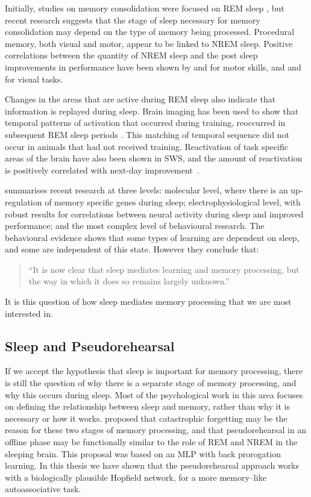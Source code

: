 Initially, studies on memory consolidation were focused on REM sleep \citep{Greenberg1981}, but recent research suggests that the stage of sleep necessary for memory consolidation may depend on the type of memory being processed.  Procedural memory, both visual and motor, appear to be linked to NREM sleep.  Positive correlations between the quantity of NREM sleep and the post sleep improvements in performance have been shown by \citet{Smith1994} and \citet{Walker2002a} for motor skills, and  \citet{Maquet2003} and \citet{Huber2004} for visual tasks.

Changes in the areas that are active during REM sleep also indicate that information is replayed during sleep.   Brain imaging has been used to show that temporal patterns of activation that occurred during training, reoccurred in subsequent REM sleep periods \citep{Pennartz2002,Maquet2000}.  This matching of temporal sequence did not occur in animals that had not received training.  Reactivation of task specific areas of the brain have also been shown in SWS, and the amount of reactivation is positively correlated with next-day improvement~\citep{Peigneux2004}.   

\citet{Walker2006} summarises recent research at three levels: molecular level, where there is an up-regulation of memory specific genes during sleep; electrophysiological level, with robust results for correlations between neural activity during sleep and improved performance; and the most complex level of behavioural research.  The behavioural evidence shows that some types of learning are dependent on sleep, and some are independent of this state.  However they conclude that:
\begin{quote}``It is now clear that sleep mediates learning and memory processing, but the way in which it does so remains largely unknown.''\citep{Walker2006} \end{quote} 
It is this question of how sleep mediates memory processing that we are most interested in.


\subsection{Sleep and Pseudorehearsal}

If we accept the hypothesis that sleep is important for memory processing, there is still the question of why there is a separate stage of memory processing, and why this occurs during sleep.  Most of the psychological work in this area focuses on defining the relationship between sleep and memory, rather than why it is necessary or how it works.  \citet{Robins1996} proposed that catastrophic forgetting may be the reason for these two stages of memory processing, and that pseudorehearsal in an offline phase may be functionally similar to the role of REM and NREM in the sleeping brain.  This proposal was based on an MLP with back prorogation learning.  In this thesis we have shown that the pseudorehearsal approach works with a biologically plausible Hopfield network, for a more memory--like autoassociative task.

